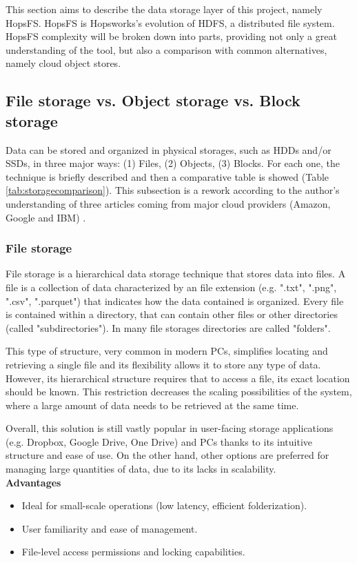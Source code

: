 This section aims to describe the data storage layer of this project, namely \gls{HopsFS}. \gls{HopsFS} is Hopsworks's evolution of \gls{HDFS}, a distributed file system. \gls{HopsFS} complexity will be broken down into parts, providing not only a great understanding of the tool, but also a comparison with common alternatives, namely cloud object stores.

\subsection{File storage vs. Object storage vs. Block storage}

Data can be stored and organized in physical storages, such as \glspl{HDD} and/or \glspl{SSD}, in three major ways: (1) Files, (2) Objects, (3) Blocks. For each one, the technique is briefly described and then a comparative table is showed (Table \ref{tab:storagecomparison}). This subsection is a rework according to the author's understanding of three articles coming from major cloud providers (Amazon, Google and IBM) \cite{BlockVsFile, HowObjectVs, ObjectVsFile2021}.

\subsubsection*{File storage}

File storage is a hierarchical data storage technique that stores data into files. A file is a collection of data characterized by an file extension (e.g. ".txt", ".png", ".csv", ".parquet") that indicates how the data contained is organized. Every file is contained within a directory, that can contain other files or other directories (called "subdirectories"). In many file storages directories are called "folders". 

This type of structure, very common in modern \glspl{PC}, simplifies locating and retrieving a single file and its flexibility allows it to store any type of data. However, its hierarchical structure requires that to access a file, its exact location should be known. This restriction decreases the scaling possibilities of the system, where a large amount of data needs to be retrieved at the same time.

Overall, this solution is still vastly popular in user-facing storage applications (e.g. Dropbox, Google Drive, One Drive) and \glspl{PC} thanks to its intuitive structure and ease of use. On the other hand, other options are preferred for managing large quantities of data, due to its lacks in scalability. \\[3mm]
\noindent\textbf{Advantages}
\begin{itemize}
    \item Ideal for small-scale operations (low latency, efficient folderization).
    \item User familiarity and ease of management.
    \item File-level access permissions and locking capabilities.
\end{itemize}

